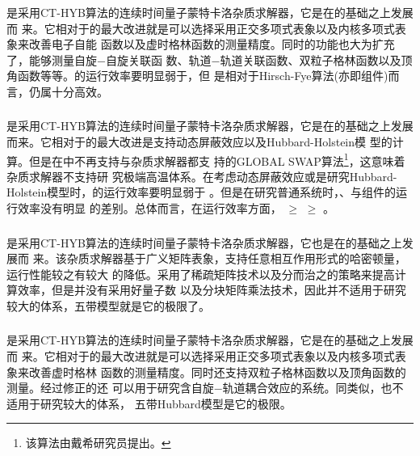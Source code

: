 \subsubsection{{\gardenia}}
{\gardenia}是采用CT-HYB算法的连续时间量子蒙特卡洛杂质求解器，它是在{\azalea}的基础之上发展而
来。它相对于{\azalea}的最大改进就是可以选择采用正交多项式表象以及内核多项式表象\cite{ortho:075145}来改善电子自能
函数以及虚时格林函数的测量精度。同时{\gardenia}的功能也大为扩充了，能够测量自旋$-$自旋关联函
数、轨道$-$轨道关联函数、双粒子格林函数以及顶角函数等等。{\gardenia}的运行效率要明显弱于{\azalea}，但
是相对于Hirsch-Fye算法(亦即{\daisy}组件)而言，仍属十分高效。

\subsubsection{{\narcissus}}
{\narcissus}是采用CT-HYB算法的连续时间量子蒙特卡洛杂质求解器，它是在{\gardenia}的基础之上发展
而来。它相对于{\gardenia}的最大改进是支持动态屏蔽效应\cite{werner:2010}以及Hubbard-Holstein模
型\cite{werner:146404}的计算。但是在{\narcissus}中不再支持{\gardenia}与{\azalea}杂质求解器都支
持的GLOBAL SWAP算法\footnote{该算法由戴希研究员提出。}，这意味着{\narcissus}杂质求解器不支持研
究极端高温体系。在考虑动态屏蔽效应或是研究Hubbard-Holstein模型时，{\narcissus}的运行效率要明显弱于
{\gardenia}。但是在研究普通系统时，{\narcissus}、{\gardenia}与{\azalea}组件的运行效率没有明显
的差别。总体而言，在运行效率方面，{\azalea} $\geq$ {\gardenia} $\geq$ {\narcissus}。

\subsubsection{{\begonia}}
{\begonia}是采用CT-HYB算法的连续时间量子蒙特卡洛杂质求解器，它也是在{\azalea}的基础之上发展而
来。该杂质求解器基于广义矩阵表象\cite{werner:155107}，支持任意相互作用形式的哈密顿量，运行性能较之{\azalea}有较大
的降低。{\begonia}采用了稀疏矩阵技术以及分而治之的策略来提高计算效率，但是并没有采用好量子数
以及分块矩阵乘法技术\cite{haule:155113}，因此{\begonia}并不适用于研究较大的体系，五带模型就是它的极限了。

\subsubsection{{\lavender}}
{\lavender}是采用CT-HYB算法的连续时间量子蒙特卡洛杂质求解器，它是在{\begonia}的基础之上发展而
来。它相对于{\begonia}的最大改进就是可以选择采用正交多项式表象以及内核多项式表象\cite{ortho:075145}来改善虚时格林
函数的测量精度。同时{\lavender}还支持双粒子格林函数以及顶角函数的测量。经过修正的{\lavender}还
可以用于研究含自旋$-$轨道耦合效应的系统。同{\begonia}类似，{\lavender}也不适用于研究较大的体系，
五带Hubbard模型是它的极限。

